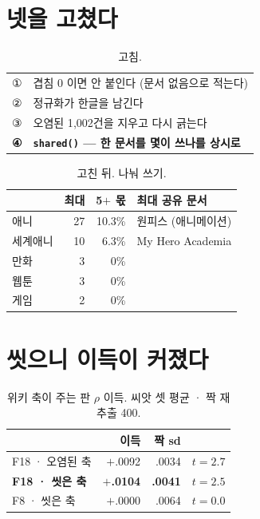 \documentclass[10pt]{article}
\begin{document}
\section{넷을 고쳤다}

\begin{table}[t]
\centering\tsize
\caption{고침.}
\begin{tabular}{ll}
\toprule
① & 겹침 0 이면 안 붙인다 (문서 없음으로 적는다) \\
② & 정규화가 한글을 남긴다 \\
③ & 오염된 1{,}002건을 지우고 다시 긁는다 \\
\textbf{④} & \textbf{\texttt{shared()} --- 한 문서를 몇이 쓰나를 상시로} \\
\bottomrule
\end{tabular}
\end{table}

\begin{table}[t]
\centering\tsize
\caption{고친 뒤. 나눠 쓰기.}
\begin{tabular}{lrrl}
\toprule
& 최대 & 5$+$ 몫 & 최대 공유 문서 \\
\midrule
애니 & 27 & 10.3\% & 원피스 (애니메이션) \\
세계애니 & 10 & 6.3\% & My Hero Academia \\
만화 & 3 & 0\% & \\
웹툰 & 3 & 0\% & \\
게임 & 2 & 0\% & \\
\bottomrule
\end{tabular}
\end{table}


\section{씻으니 이득이 커졌다}

\begin{table}[t]
\centering\tsize
\caption{위키 축이 주는 판 $\rho$ 이득. 씨앗 셋 평균 · 짝 재추출 400.}
\begin{tabular}{lrrl}
\toprule
& 이득 & 짝 sd & \\
\midrule
F18 · 오염된 축 & $+$.0092 & .0034 & $t{=}2.7$ \\
\textbf{F18 · 씻은 축} & \textbf{$+$.0104} & \textbf{.0041} & \textbf{$t{=}2.5$} \\
F8 · 씻은 축 & $+$.0000 & .0064 & $t{=}0.0$ \\
\bottomrule
\end{tabular}
\end{table}
\end{document}
